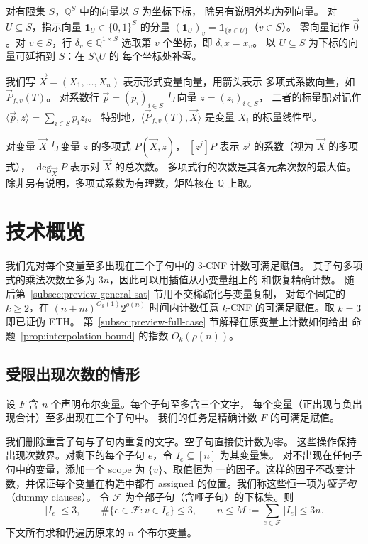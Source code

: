 \documentclass[11pt,reqno]{amsart}
\numberwithin{equation}{section}
\theoremstyle{definition}\newtheorem{definition}[theorem]{定义}
\theoremstyle{remark}\newtheorem{remark}[theorem]{注}
\renewcommand{\le}{\leqslant}
\renewcommand{\ge}{\geqslant}
\begin{document}
对有限集 $S$，$\mathbb Q^S$ 中的向量以 $S$ 为坐标下标，
除另有说明外均为列向量。
对 $U\subseteq S$，指示向量 $\mathbf1_U\in\{0,1\}^S$ 的分量
$(\mathbf1_U)_v=\mathds{1}_{\{v\in U\}}$（$v\in S$）。
零向量记作 $\vec{0}$。对 $v\in S$，行 $\delta_v\in\mathbb Q^{1\times S}$
选取第 $v$ 个坐标，即 $\delta_vx=x_v$。
以 $U\subseteq S$ 为下标的向量可延拓到 $S$：在 $S\setminus U$ 的
每个坐标处补零。

我们写 $\vec{X}=(X_1,\ldots,X_n)$ 表示形式变量向量，用箭头表示
多项式系数向量，如 $\vec{P}_{f,v}(T)$。
对系数行 $\vec{p}=(p_i)_{i\in S}$ 与向量 $z=(z_i)_{i\in S}$，
二者的标量配对记作 $\langle\vec{p},z\rangle=\sum_{i\in S}p_i z_i$。
特别地，$\langle\vec{P}_{f,v}(T),\vec{X}\rangle$ 是变量 $X_i$
的标量线性型。

对变量 $\vec{X}$ 与变量 $z$ 的多项式 $P(\vec{X},z)$，
$[z^j]P$ 表示 $z^j$ 的系数（视为 $\vec{X}$ 的多项式），
$\deg_{\vec{X}} P$ 表示对 $\vec{X}$ 的总次数。
多项式行的次数是其各元素次数的最大值。
除非另有说明，多项式系数为有理数，矩阵核在 $\mathbb Q$ 上取。
\section{技术概览}\label{sec:technical-overview}
我们先对每个变量至多出现在三个子句中的 $3$-CNF 计数可满足赋值。
其子句多项式的乘法次数至多为 $3n$，因此可以用插值从小变量组上的
和恢复精确计数。
随后第~\ref{subsec:preview-general-sat} 节用不交稀疏化与变量复制，
对每个固定的 $k\ge2$，在 $(n+m)^{O_k(1)}2^{o(n)}$ 时间内计数任意
$k$-CNF 的可满足赋值。取 $k=3$ 即已证伪 ETH。
第~\ref{subsec:preview-full-case} 节解释在原变量上计数如何给出
命题~\ref{prop:interpolation-bound} 的指数 $O_k(\rho(n))$。

\subsection{受限出现次数的情形}\label{subsec:preview-setting}
设 $F$ 含 $n$ 个声明布尔变量。每个子句至多含三个文字，
每个变量（正出现与负出现合计）至多出现在三个子句中。
我们的任务是精确计数 $F$ 的可满足赋值。

我们删除重言子句与子句内重复的文字。空子句直接使计数为零。
这些操作保持出现次数界。对剩下的每个子句 $e$，令
$I_e\subseteq[n]$ 为其变量集。
对不出现在任何子句中的变量，添加一个 scope 为 $\{v\}$、取值恒为
一的因子。这样的因子不改变计数，并保证每个变量在构造中都有
 assigned 的位置。我们称这些恒一项为\emph{哑子句}（dummy clauses）。
令 $\mathcal F$ 为全部子句（含哑子句）的下标集。则
\begin{equation}\label{eq:overview-incidences}
 |I_e|\le3,\qquad
 \#\{e\in\mathcal F:v\in I_e\}\le3,\qquad
 n\le M:=\sum_{e\in\mathcal F}|I_e|\le3n.
\end{equation}
下文所有求和仍遍历原来的 $n$ 个布尔变量。
\end{document}
